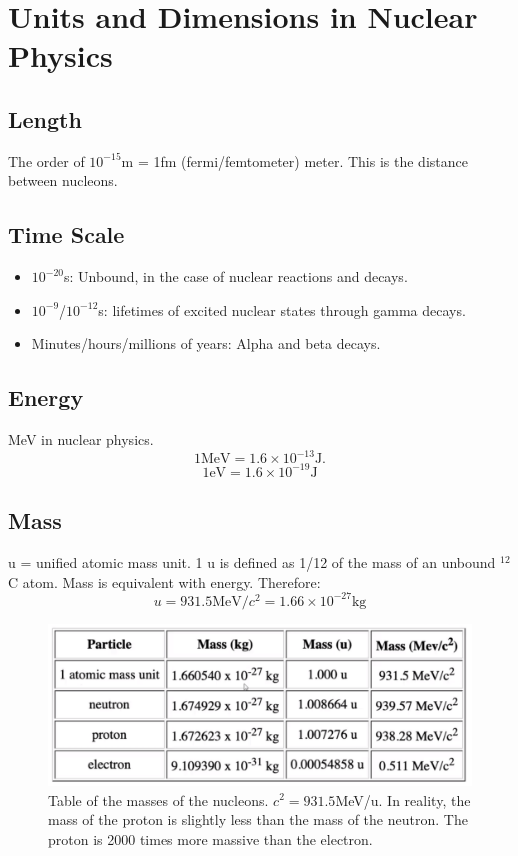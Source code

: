 \section{Units and Dimensions in Nuclear Physics}
\subsection{Length}
The order of $10^{-15}$m = 1fm (fermi/femtometer) meter. This is the distance between nucleons.

\subsection{Time Scale}
\begin{itemize}
    \item $10^{-20}$s: Unbound, in the case of nuclear reactions and decays. 
    \item $10^{-9}$/$10^{-12}$s: lifetimes of excited nuclear states through gamma decays. 
    \item Minutes/hours/millions of years: Alpha and beta decays. 
\end{itemize}

\subsection{Energy}
MeV in nuclear physics. 
\begin{equation}
    1 \text{MeV} = 1.6 \times 10^{-13} \text{J}. 
    \end{equation}
    \begin{equation}
        1 \text{eV} = 1.6 \times 10^{-19} \text{J}
        \end{equation}

\subsection{Mass}
u = unified atomic mass unit. 1 u is defined as 1/12 of the mass of an unbound $^{12}$C atom. Mass is equivalent with energy. Therefore:
\begin{equation}
u = 931.5 \text{MeV} / c^2 = 1.66 \times 10^{-27} \text{kg}
\end{equation}
\begin{figure}[ht!]
    \centering
    \includegraphics[width = \textwidth]{nucleon_mass_table.png}
    \caption{Table of the masses of the nucleons. $c^2 = 931.5$MeV/u. In reality, the mass of the proton is slightly less than the mass of the neutron. The proton is 2000 times more massive than the electron.}
    \label{fig: }
\end{figure}


